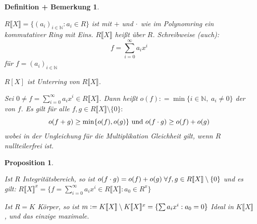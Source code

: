 \documentclass[a4paper,10pt,german]{scrbook}
\theoremstyle{saetze}
\theoremstyle{definitionen}
\newtheorem{DefBem}[Def]{Definition + Bemerkung}
\newtheorem{Prop}[Def]{Proposition}
\begin{document}
\begin{DefBem}
\begin{enum}
\item $R\llbracket X\rrbracket = \{ (a_i)_{i \in \mathbb{N}}: a_i \in
R\}$ ist mit $+$ und $\cdot$ wie im Polynomring ein kommutativer Ring
mit Eins. $R\llbracket X\rrbracket$ heißt  über $R$.
\newline Schreibweise (auch): \[f = \sum_{i=0}^\infty a_i x^i\] für
$f=(a_i)_{i \in \mathbb{N}}$
\item $R[X]$ ist Unterring von $R\llbracket X \rrbracket$.
\item Sei $0 \neq f = \sum_{i=0}^\infty a_i x^i \in
R\llbracket X\rrbracket$. Dann heißt $o(f) \mathrel{\mathop:}=
\min\{i \in \mathbb{N},\; a_i \neq 0 \}$ der  von
$f$. Es gilt für alle $f,g \in R\llbracket X\rrbracket \setminus
\{0\}:$ \[o(f+g) \geq \min \{o(f), o(g)\} \mbox{ und } o(f\cdot g)
\geq o(f) + o(g)\]
wobei in der Ungleichung für die Multiplikation Gleichheit gilt, wenn $R$ nullteilerfrei ist.
\end{enum}
\end{DefBem}

\begin{Prop}
\begin{enum}
\item Ist $R$ Integritätsbereich, so ist $o(f\cdot g) = o(f) + o(g)\;
\forall f,g \in R\llbracket X\rrbracket \setminus \{0\}$ und es
gilt: $R\llbracket X\rrbracket^x = \{ f = \sum_{i=0}^\infty a_i x^i
\in R\llbracket X\rrbracket : a_0 \in R^x \}$

\item Ist $R = K$ Körper, so ist $m \mathrel{\mathop:}= K\llbracket
X\rrbracket \setminus K\llbracket X\rrbracket^x = \{ \sum a_i x^i :
a_0 = 0\}$ Ideal in $K\llbracket X\rrbracket$, und das einzige maximale.


\end{enum}
\end{Prop}
\end{document}
